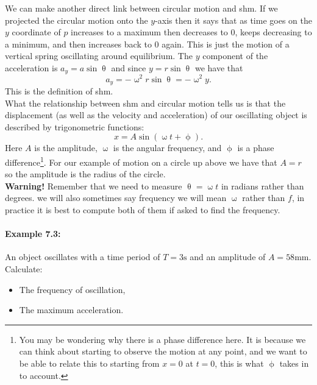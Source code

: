 We can make another direct link between circular motion and shm. If we projected the circular motion onto the $y$-axis then it says that as time goes on the $y$ coordinate of $p$ increases to a maximum then decreases to $0$, keeps decreasing to a minimum, and then increases back to $0$ again. This is just the motion of a vertical spring oscillating around equilibrium. The $y$ component of the acceleration is $a_{y}=a\sin\uptheta$ and since $y=r\sin\uptheta$ we have that
\begin{equation*}
a_{y}=-\upomega^{2} r\sin\uptheta=-\upomega^{2}y.
\end{equation*}
This is the definition of shm.\\

What the relationship between shm and circular motion tells us is that the displacement (as well as the velocity and acceleration) of our oscillating object is described by trigonometric functions:
\begin{equation}
x=A\sin\left(\upomega t+\upphi\right).
\end{equation}
Here $A$ is the amplitude, $\upomega$ is the angular frequency, and $\upphi$ is a phase difference\footnote{You may be wondering why there is a phase difference here. It is because we can think about starting to observe the motion at any point, and we want to be able to relate this to starting from $x=0$ at $t=0$, this is what $\upphi$ takes in to account.}. For our example of motion on a circle up above we have that $A=r$ so the amplitude is the radius of the circle.\\

\textbf{Warning!} Remember that we need to measure $\uptheta=\upomega t$ in radians rather than degrees. we will also sometimes say frequency we will mean $\upomega$ rather than $f$, in practice it is best to compute both of them if asked to find the frequency.\\

\paragraph{Example 7.3:} An object oscillates with a time period of $T=3\text{s}$ and an amplitude of $A=58\text{mm}$. Calculate:
\begin{itemize}
\setlength{\itemsep}{-5pt}
    \item[a)] The frequency of oscillation,
    \item[b)] The maximum acceleration.
\end{itemize}  


